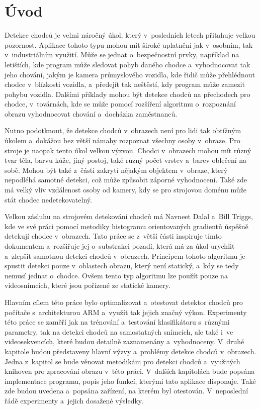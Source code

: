 \section{Úvod}
Detekce chodců je velmi náročný úkol, který v~posledních letech přitahuje velkou pozornost. 
Aplikace tohoto typu mohou mít široké uplatnění jak v~osobním, tak v~industriálním využití. Může se jednat o~bezpečnostní prvky, například na letištích, kde program může sledovat pohyb daného chodce a~vyhodnocovat tak jeho chování, jakým je kamera průmyslového vozidla, kde řidič může přehlédnout chodce v~blízkosti vozidla, a~předejít tak neštěstí, kdy program může zamezit pohybu vozidla. Dalšími příklady mohou být detekce chodců na přechodech pro chodce, v~továrnách, kde se může pomocí rozšíření algoritmu o~rozpoznání obrazu vyhodnocovat chování a~docházka zaměstnanců. 

Nutno podotknout, že detekce chodců v~obrazech není pro lidi tak obtížným ůkolem a~dokážou bez větší námahy rozpoznat všechny osoby v~obraze. Pro stroje je naopak tento úkol velkou výzvou. Chodci v~obrazech mohou mít různý tvar těla, barvu kůže, jiný postoj, také různý počet vrstev a~barev oblečení na sobě. Mohou být také z~části zakrytí nějakým objektem v~obraze, který nepodléhá samotné detekci, což může způsobit záporné vyhodnocení. Také zde má velký vliv vzdálenost osoby od kamery, kdy se pro strojovou doménu může stát chodec nedetekovatelný. 

Velkou zásluhu na strojovém detekování chodců má Navneet Dalal a~Bill Triggs, kde ve své práci \cite{hog:dalal} pomocí metodiky histogramu orientovaných gradientů úspěšně detekují chodce v~obrazech. Tato práce se z~větší části inspiruje tímto dokumentem a~rozšiřuje jej o~substrakci pozadí, která má za úkol urychlit a~zlepšit samotnou detekci chodců v~obrazech. Principem tohoto algoritmu je spustit detekci pouze v~oblastech obrazu, který není statický, a~kdy se tedy nemusí jednat o~chodce. Ovšem tento typ algoritmu lze použít pouze na videosnímcích, které jsou pořízené ze statické kamery.

Hlavním cílem této práce bylo optimalizovat a~otestovat detektor chodců pro počítače s~architekturou ARM a~využít tak jejich značný výkon. 
Experimenty této práce se zaměří jak na trénování a~testování klasifikátoru s~různými parametry, tak na detekci chodců na samostatných snímcích, ale také i~ve videosekvencích, které budou detailně zaznamenány a~vyhodnoceny. 
V~druhé kapitole budou představeny hlavní výzvy a~problémy detekce chodců v~obrazech.
Jedna z~kapitol se bude věnovat metodikám pro detekci chodců a~využitých knihoven pro zpracování obrazu v~této práci.
V~dalších kapitolách bude popsána implementace programu, popis jeho funkcí, kterými tato aplikace disponuje. Také zde budou uvedena a~popsána zařízení, na kterém byl otestován. V~neposlední řádě experimenty a~jejich dosažené výsledky.